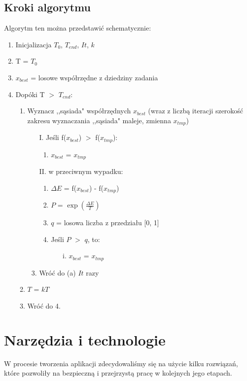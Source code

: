 \documentclass[twoside]{projektInzynierskiMS1}
\newcommand{\si}{ś}
\begin{document}
		\subsection{Kroki algorytmu}
		
		Algorytm ten można przedstawić schematycznie:

\begin{enumerate}
	\item Inicjalizacja $T_{0}$, $T_{end}$, $It$, $k$
	\item T = $T_{0}$
	\item $x_{best}$ = losowe współrzędne z dziedziny zadania
	\item Dopóki T $>$ $T_{end}$:
	
	\begin{enumerate}
		\item  Wyznacz ,,sąsiada" współrzędnych $x_{best}$ (wraz z liczbą iteracji szeroko\si ć zakresu wyznaczania ,,sąsiada" maleje, zmienna $x_{tmp}$)
		\begin{enumerate}
			\item[I.] Je\si li f($x_{best}$) $>$ f($x_{tmp}$):
			\begin{enumerate}
				\item $x_{best}$ = $x_{tmp}$
			\end{enumerate}
			\item[II.] w przeciwnym wypadku:
			\begin{enumerate}
				\item $\Delta E$ = f($x_{best}$) - f($x_{tmp}$)
				\item $P$ = $\exp\left(\frac{\Delta E}{T}\right)$
				\item $q$ = losowa liczba z przedziału [0, 1]
				\item Je\si li $P$ $>$ $q$, to:
				\begin{itemize}
					\item[i.] $x_{best}$ = $x_{tmp}$
				\end{itemize}
			\end{enumerate}
			\item Wróć do (a) $It$ razy
		\end{enumerate}
		\item $T$ = $k$$T$
		\item Wróć do 4.
	\end{enumerate}	
\end{enumerate}
	

\section{Narzędzia i technologie}
W procesie tworzenia aplikacji zdecydowali\si my się na użycie kilku rozwiązań, które pozwoliły na bezpieczną i przejrzystą pracę w kolejnych jego etapach. \\
\end{document}

